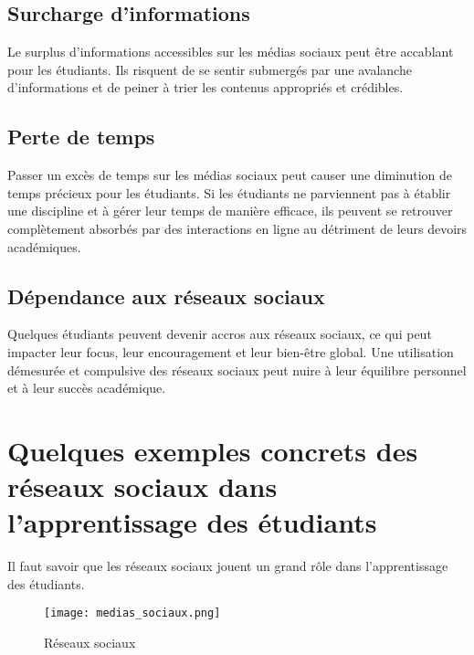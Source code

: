 \documentclass[12pt,a4paper,titlepage]{article}
\begin{document}
\subsection{Surcharge d'informations} 
Le surplus d'informations accessibles sur les médias sociaux peut être accablant pour les étudiants. Ils risquent de se sentir submergés par une avalanche d'informations et de peiner à trier les contenus appropriés et crédibles.
\subsection{Perte de temps}
Passer un excès de temps sur les médias sociaux peut causer une diminution de temps précieux pour les étudiants. Si les étudiants ne parviennent pas à établir une discipline et à gérer leur temps de manière efficace, ils peuvent se retrouver complètement absorbés par des interactions en ligne au détriment de leurs devoirs académiques.
\subsection{Dépendance aux réseaux sociaux}
Quelques étudiants peuvent devenir accros aux réseaux sociaux, ce qui peut impacter leur focus, leur encouragement et leur bien-être global. Une utilisation démesurée et compulsive des réseaux sociaux peut nuire à leur équilibre personnel et à leur succès académique.
\section{Quelques exemples concrets des réseaux sociaux dans      l’apprentissage des étudiants}
 Il faut savoir que les réseaux sociaux jouent un grand rôle dans l’apprentissage des étudiants.


\begin{figure}[htp]

    \centering

    \texttt{[image: medias\_sociaux.png]}

    \caption{Réseaux sociaux}

    \label{fig:galaxy}

\end{figure}
\end{document}
